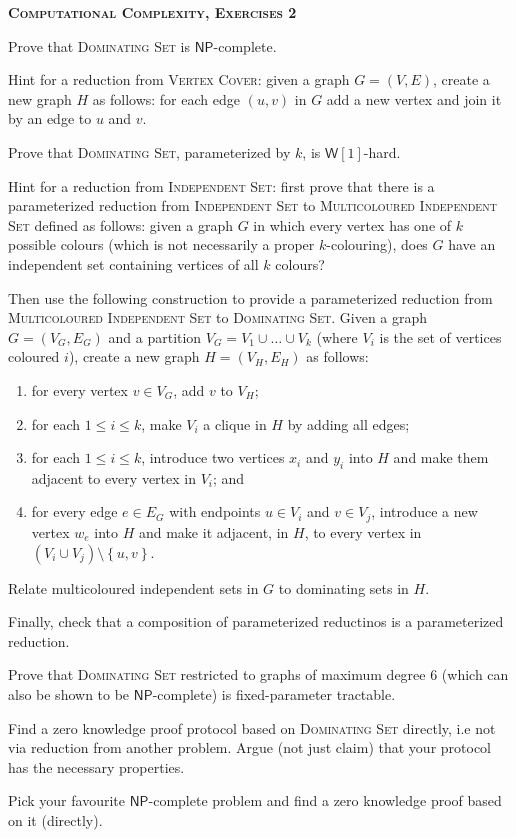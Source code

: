 \documentclass[a4paper, answers]{exam}
\begin{document}
\begin{center}
	\textbf{\textsc{Computational Complexity, Exercises 2}}
\end{center}

\vspace{1em}

\begin{questions}
	\question Prove that \textsc{Dominating Set} is $\mathsf{NP}$-complete.

	Hint for a reduction from \textsc{Vertex Cover}: given a graph $G = (V,E)$,
	create a new graph $H$ as follows: for each edge $(u,v)$ in $G$ add a new
	vertex and join it by an edge to $u$ and $v$.

	\question Prove that \textsc{Dominating Set}, parameterized by $k$, is
	$\textsf{W}[1]$-hard.

	Hint for a reduction from \textsc{Independent Set}: first prove that there is
	a parameterized reduction from \textsc{Independent Set} to
	\textsc{Multicoloured Independent Set} defined as follows: given a graph $G$
	in which every vertex has one of $k$ possible colours (which is not
	necessarily a proper $k$-colouring), does $G$ have an independent set
	containing vertices of all $k$ colours?

	Then use the following construction to provide a parameterized reduction from
	\textsc{Multicoloured Independent Set} to \textsc{Dominating Set}.
	Given a graph $G = (V_G, E_G)$ and a partition 
	$V_G = V_1 \cup \ldots \cup V_k$ (where $V_i$ is the set of vertices coloured
	$i$), create a new graph $H = (V_H, E_H)$ as follows:
	\begin{enumerate}
		\item for every vertex $v \in V_G$, add $v$ to $V_H$;
		\item for each $1 \leq i \leq k$, make $V_i$ a clique in $H$ by adding
			all edges;
		\item for each $1 \leq i \leq k$, introduce two vertices $x_i$ and $y_i$
			into $H$ and make them adjacent to every vertex in $V_i$; and
		\item for every edge $e \in E_G$ with endpoints $u \in V_i$ and 
			$v \in V_j$, introduce a new vertex $w_e$ into $H$ and make it
			adjacent, in $H$, to every vertex in 
			$(V_i \cup V_j) \setminus \left\{ u,v \right\}$.
	\end{enumerate}
	Relate multicoloured independent sets in $G$ to dominating sets in $H$.
	
	Finally, check that a composition of parameterized reductinos is a
	parameterized reduction.

	\question Prove that \textsc{Dominating Set} restricted to graphs of maximum
	degree $6$ (which can also be shown to be $\mathsf{NP}$-complete) is 
	fixed-parameter tractable.

	\question Find a zero knowledge proof protocol based on \textsc{Dominating
	Set} directly, i.e not via reduction from another problem.
	Argue (not just claim) that your protocol has the necessary properties.

	\question Pick your favourite $\mathsf{NP}$-complete problem and find a zero
	knowledge proof based on it (directly).
\end{questions}
\end{document}
